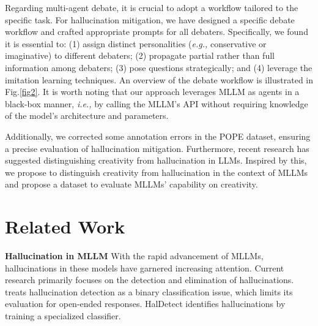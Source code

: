 \documentclass[10pt,twocolumn,letterpaper]{article}
\begin{document}
Regarding multi-agent debate, it is crucial to adopt a workflow tailored to the specific task. For hallucination mitigation, we have designed a specific debate workflow and crafted appropriate prompts for all debaters. Specifically, we found it is essential to: (1) assign distinct personalities (\emph{e.g.,} conservative or imaginative) to different debaters; (2) propagate partial rather than full information among debaters; (3) pose questions strategically; and (4) leverage the imitation learning techniques.
An overview of the debate workflow is illustrated in Fig.\ref{fig2}.
It is worth noting that our approach leverages MLLM as agents in a black-box manner, \emph{i.e.,} by calling the MLLM's API without requiring knowledge of the model's architecture and parameters. 

Additionally, we corrected some annotation errors in the POPE dataset, ensuring a precise evaluation of hallucination mitigation. Furthermore, recent research has suggested distinguishing creativity from hallucination in LLMs. Inspired by this, we propose to distinguish creativity from hallucination in the context of MLLMs and propose a dataset to evaluate MLLMs' capability on creativity.







\section{Related Work}
\noindent\textbf{Hallucination in MLLM}
With the rapid advancement of MLLMs, hallucinations in these models have garnered increasing attention. Current research primarily focuses on the detection and elimination of hallucinations. \cite{li2023objecthallucination} treats hallucination detection as a binary classification issue, which limits its evaluation for open-ended responses. HalDetect \cite{gunjal2024detecting} identifies hallucinations by training a specialized classifier.
\end{document}
